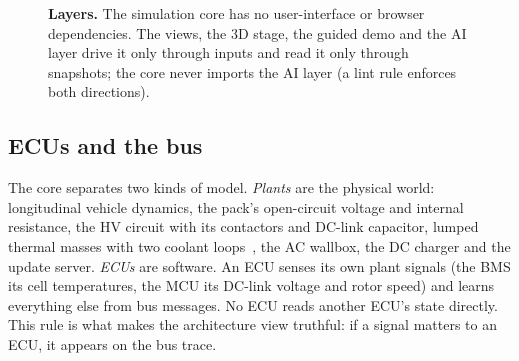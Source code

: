 \documentclass[10pt]{article}
\begin{document}
\begin{figure}[!htbp]
\caption{\textbf{Layers.} The simulation core has no user-interface or browser dependencies. The views, the 3D stage, the guided demo and the AI layer drive it only through inputs and read it only through snapshots; the core never imports the AI layer (a lint rule enforces both directions).}
\label{fig:layers}
\end{figure}

\subsection{ECUs and the bus}

The core separates two kinds of model. \emph{Plants} are the physical world: longitudinal vehicle dynamics, the pack's open-circuit voltage and internal resistance, the HV circuit with its contactors and DC-link capacitor, lumped thermal masses with two coolant loops~\cite{pesaran2002}, the AC wallbox, the DC charger and the update server. \emph{ECUs} are software. An ECU senses its own plant signals (the BMS its cell temperatures, the MCU its DC-link voltage and rotor speed) and learns everything else from bus messages. No ECU reads another ECU's state directly. This rule is what makes the architecture view truthful: if a signal matters to an ECU, it appears on the bus trace.
\end{document}
